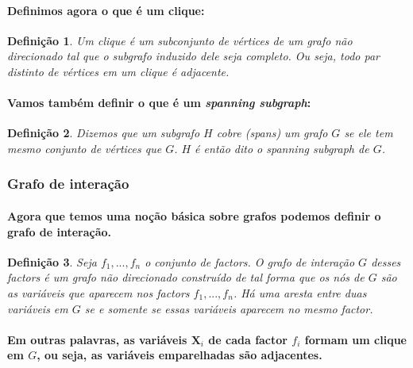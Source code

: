 \documentclass[a4paper,10pt]{article}
\theoremstyle{plain}
\newtheorem*{spn-def}{Definição}
\begin{document}
\paragraph{
  Definimos agora o que é um clique:
}

\begin{spn-def} Um clique é um subconjunto de vértices de um grafo não direcionado tal que o 
  subgrafo induzido dele seja completo. Ou seja, todo par distinto de vértices em um clique é 
  adjacente.
\end{spn-def}

\paragraph{
  Vamos também definir o que é um \textit{spanning subgraph}:
}

\begin{spn-def} Dizemos que um subgrafo $H$ cobre (\textit{spans}) um grafo $G$ se ele tem mesmo
  conjunto de vértices que $G$. $H$ é então dito o \textit{spanning subgraph} de $G$.
\end{spn-def}

\subsubsection{Grafo de interação}

\paragraph{
  Agora que temos uma noção básica sobre grafos podemos definir o grafo de interação.
}

\begin{spn-def} Seja $f_1,...,f_n$ o conjunto de factors. O \textit{grafo de interação} $G$ desses
  factors é um grafo não direcionado construído de tal forma que os nós de $G$ são as variáveis que
  aparecem nos factors $f_1,...,f_n$. Há uma aresta entre duas variáveis em $G$ se e somente se 
  essas variáveis aparecem no mesmo factor.
\end{spn-def}

\paragraph{
  Em outras palavras, as variáveis $\textbf{X}_i$ de cada factor $f_i$ formam um clique em $G$, ou
  seja, as variáveis emparelhadas são adjacentes.
}
\end{document}
